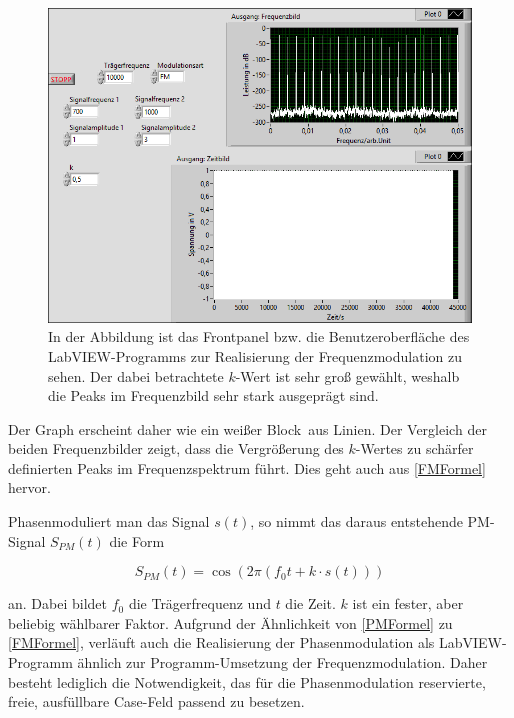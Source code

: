 \documentclass[
a4paper,
12pt,
pagesize,
ngerman
]{scrartcl}
\begin{document}
	\begin{figure}[H]
		\centering
		\includegraphics[width=1.0\textwidth]{EIRE2018Dateien/Tag4/FMPM-Erzeugung/anderekbei10000Traegerfr/FM-FMPM-Erzeugungp}
		\caption{In der Abbildung ist das Frontpanel bzw. die Benutzeroberfläche des LabVIEW-Programms zur Realisierung der Frequenzmodulation zu sehen. Der dabei betrachtete $k$-Wert ist sehr groß gewählt, weshalb die Peaks im Frequenzbild sehr stark ausgeprägt sind.}
		\label{FMAusgabegrossesk}
	\end{figure}
	
	\noindent Der Graph erscheint daher wie ein \glqq weißer Block\grqq\ aus Linien. 
	Der Vergleich der beiden Frequenzbilder zeigt, dass die Vergrößerung des $k$-Wertes zu schärfer definierten Peaks im Frequenzspektrum führt.
	Dies geht auch aus \cref{FMFormel} hervor.
	
	Phasenmoduliert man das Signal $s(t)$, so nimmt das daraus entstehende PM-Signal $S_{PM}(t)$ die Form
	
	\begin{equation} \label{PMFormel}
	S_{PM}(t) = \cos (2\pi (f_0 t + k \cdot s(t)))
	\end{equation}
	
	\noindent an. 
	Dabei bildet $f_0$ die Trägerfrequenz und $t$ die Zeit. 
	$k$ ist ein fester, aber beliebig wählbarer Faktor. 
	Aufgrund der Ähnlichkeit von \cref{PMFormel} zu \cref{FMFormel}, verläuft auch die Realisierung der Phasenmodulation als LabVIEW-Programm ähnlich zur Programm-Umsetzung der Frequenzmodulation. 
	Daher besteht lediglich die Notwendigkeit, das für die Phasenmodulation reservierte, freie, ausfüllbare Case-Feld passend zu besetzen. %
	
\end{document}
